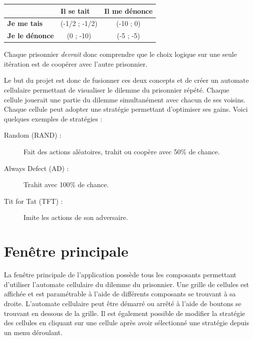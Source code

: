 \documentclass[a4paper, french]{article}
\begin{document}
\begin{framed}
        \begin{center}
            \begin{tabular}{|l|c|c|}
            \hline
            \textbf{} & \multicolumn{1}{l|}{\textbf{Il se tait}} & \multicolumn{1}{l|}{\textbf{Il me dénonce}} \\ \hline
            \textbf{Je me tais}         & (-1/2 ; -1/2)                            & (-10 ; 0)                                   \\ \hline
            \textbf{Je le dénonce}      & (0 ; -10)                                & (-5 ; -5)                                   \\ \hline
            \end{tabular}
        \end{center}
        
        Chaque prisonnier \textit{devrait} donc comprendre que le choix logique sur une seule itération est de coopérer avec l'autre prisonnier.
\end{framed}

Le but du projet est donc de fusionner ces deux concepts et de créer un automate cellulaire permettant de visualiser le dilemme du prisonnier répété. Chaque cellule jouerait une partie du dilemme simultanément avec chacun de ses voisins. Chaque cellule peut adopter une stratégie permettant d'optimiser ses gains. Voici quelques exemples de stratégies :
\begin{framed}
    \begin{description}
        \item[Random (RAND) : ] Fait des actions aléatoires, trahit ou coopère avec 50\% de chance.
        \item[Always Defect (AD) : ] Trahit avec 100\% de chance.
        \item[Tit for Tat (TFT) : ] Imite les actions de son adversaire.
    \end{description}
\end{framed}

\pagebreak
\section{Fenêtre principale}
La fenêtre principale de l'application possède tous les composants permettant d'utiliser l'automate cellulaire du dilemme du prisonnier. Une grille de cellules est affichée et est paramétrable à l'aide de différents composants se trouvant à sa droite. L'automate cellulaire peut être démarré ou arrêté à l'aide de boutons se trouvant en dessous de la grille. Il est également possible de modifier la stratégie des cellules en cliquant sur une cellule après avoir sélectionné une stratégie depuis un menu déroulant.
\end{document}
